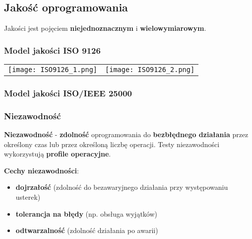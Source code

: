 \documentclass[../main.tex]{subfiles}
\begin{document}
    \subsection{Jakość oprogramowania}
    Jakości jest pojęciem \textbf{niejednoznacznym} i \textbf{wielowymiarowym}.

    \subsubsection{Model jakości ISO 9126}

    \begin{table}[H]
        \begin{center}
            \begin{tabular}{ p{8cm} p{8cm}}
                \texttt{[image: ISO9126\_1.png]}
                &
                \texttt{[image: ISO9126\_2.png]}
            \end{tabular}
        \end{center}
    \end{table}


    \subsubsection{Model jakości ISO/IEEE 25000}

    \subsubsection{Niezawodność}

    \textbf{Niezawodność} - \textbf{zdolność} oprogramowania do \textbf{bezbłędnego działania} przez określony czas lub przez określoną
    liczbę operacji. Testy niezawodności wykorzystują \textbf{profile operacyjne}.

    \textbf{Cechy niezawodności}:
    \begin{itemize}
        \item \textbf{dojrzałość} (zdolność do bezawaryjnego działania przy występowaniu usterek)
        \item \textbf{tolerancja na błędy} (np. obsługa wyjątków)
        \item \textbf{odtwarzalność} (zdolność działania po awarii)
    \end{itemize}
\end{document}
